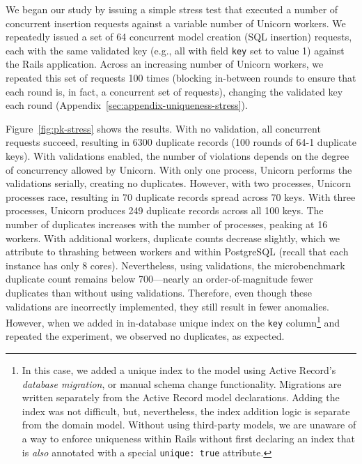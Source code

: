 We began our study by issuing a simple stress
test that executed a number of concurrent insertion requests against a
variable number of Unicorn workers. We repeatedly issued a set of 64
concurrent model creation (SQL insertion) requests, each with the same
validated key (e.g., all with field \texttt{key} set to value 1)
against the Rails application. Across an increasing number of Unicorn
workers, we repeated this set of requests 100 times (blocking
in-between rounds to ensure that each round is, in fact, a concurrent
set of requests), changing the validated key each round
(Appendix~\ref{sec:appendix-uniqueness-stress}).

Figure~\ref{fig:pk-stress} shows the results. With no validation, all
concurrent requests succeed, resulting in 6300 duplicate records (100
rounds of 64-1 duplicate keys). With validations enabled, the number
of violations depends on the degree of concurrency allowed by
Unicorn. With only one process, Unicorn performs the validations
serially, creating no duplicates. However, with two processes, Unicorn
processes race, resulting in 70 duplicate records spread across 70
keys. With three processes, Unicorn produces 249 duplicate records
across all 100 keys. The number of duplicates increases with the
number of processes, peaking at 16 workers. With additional workers,
duplicate counts decrease slightly, which we attribute to thrashing
between workers and within PostgreSQL (recall that each instance has
only 8 cores). Nevertheless, using validations, the microbenchmark
duplicate count remains below 700---nearly an order-of-magnitude fewer
duplicates than without using validations. Therefore, even though
these validations are incorrectly implemented, they still
result in fewer anomalies. However, when we added in in-database
unique index on the \texttt{key} column\footnote{In this case, we
  added a unique index to the model using Active Record's
  \textit{database migration}, or manual schema change
  functionality. Migrations are written separately from the Active
  Record model declarations. Adding the index was not difficult, but,
  nevertheless, the index addition logic is separate from the domain
  model. Without using third-party models, we are unaware of a way to
  enforce uniqueness within Rails without first declaring an index
  that is \textit{also} annotated with a special \texttt{unique: true}
  attribute.} and repeated the experiment, we observed no duplicates,
as expected.

